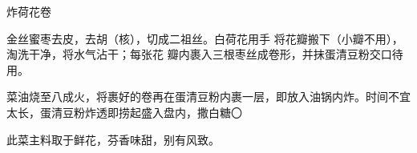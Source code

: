\begin{recipe}{炸荷花卷}

\ingredients


\cooking

金丝蜜枣去皮，去胡（核），切成二祖丝。白荷花用手 将花瓣搬下（小瓣不用），淘洗干净，将水气沾干；每张花 瓣内裹入三根枣丝成卷形，并抹蛋清豆粉交口待用。

\step 菜油烧至八成火，将裹好的卷再在蛋清豆粉内裹一层，即放入油锅内炸。时间不宜太长，蛋清豆粉炸透即捞起盛入盘内，撒白糖〇

\notes

此菜主料取于鲜花，芬香味甜，别有风致。

\end{recipe}

